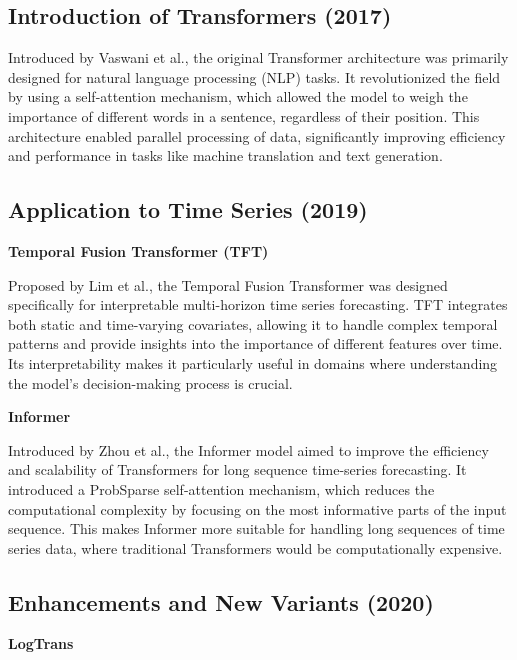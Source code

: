 \subsection{Introduction of Transformers (2017)}

Introduced by Vaswani et al.\cite{vaswani2023attention}, the original Transformer architecture was primarily designed for natural language processing (NLP) tasks. It revolutionized the field by using a self-attention mechanism, which allowed the model to weigh the importance of different words in a sentence, regardless of their position. This architecture enabled parallel processing of data, significantly improving efficiency and performance in tasks like machine translation and text generation.
\vspace{10pt}


\subsection{Application to Time Series (2019)}
\noindent\textbf
{Temporal Fusion Transformer (TFT)}

\noindent Proposed by Lim et al.\cite{lim2020temporalfusiontransformersinterpretable}, the Temporal Fusion Transformer was designed specifically for interpretable multi-horizon time series forecasting. TFT integrates both static and time-varying covariates, allowing it to handle complex temporal patterns and provide insights into the importance of different features over time. Its interpretability makes it particularly useful in domains where understanding the model’s decision-making process is crucial.
\vspace{10pt}


\noindent\textbf
{Informer}

\noindent Introduced by Zhou et al.\cite{zhou2021informerefficienttransformerlong}, the Informer model aimed to improve the efficiency and scalability of Transformers for long sequence time-series forecasting. It introduced a ProbSparse self-attention mechanism, which reduces the computational complexity by focusing on the most informative parts of the input sequence. This makes Informer more suitable for handling long sequences of time series data, where traditional Transformers would be computationally expensive.
\vspace{10pt}


\subsection{Enhancements and New Variants (2020)}
\noindent\textbf
{LogTrans}

